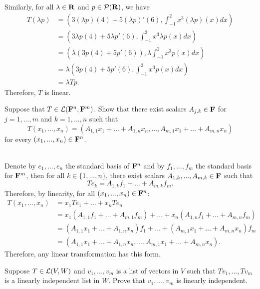 \begin{solution}
    Similarly, for all $\lambda \in \mathbf{R}$ and $p \in \mathcal{P}(\mathbf{R})$, we have
    \begin{align*}
        T(\lambda p) &= \left(3(\lambda p)(4) + 5(\lambda p)'(6), \int_{-1}^{2}x^3(\lambda p)(x)dx \right) \\
        &= \left(3\lambda p(4) + 5\lambda p'(6), \int_{-1}^{2}x^3 \lambda p(x)dx \right) \\
        &= \left(\lambda (3p(4) + 5p'(6)), \lambda\int_{-1}^{2}x^3 p(x)dx \right) \\
        &= \lambda \left(3p(4) + 5p'(6), \int_{-1}^{2}x^3 p(x)dx \right) \\
        &= \lambda Tp.
    \end{align*}
    Therefore, $T$ is linear. \\
\end{solution}

\begin{exercise}
    Suppose that $T \in \mathcal{L}(\mathbf{F}^n, \mathbf{F}^m)$. Show that there exist scalars $A_{j,k} \in \mathbf{F}$ for $j = 1, ..., m$ and $k= 1, ..., n$ such that 
    $$T(x_1, ..., x_n) = (A_{1,1}x_1 + \dots + A_{1,n}x_n, ..., A_{m,1}x_1 + \dots + A_{m,n}x_n)$$
    for every $(x_1, ..., x_n) \in \mathbf{F}^n$. \\
\end{exercise}

\begin{solution}
    \\ Denote by $e_1, ..., e_n$ the standard basis of $\mathbf{F}^n$ and by $f_1, ..., f_m$ the standard basis for $\mathbf{F}^m$, then for all $k \in \{1, ..., n\}$, there exist scalars $A_{1,k}, ..., A_{m,k} \in \mathbf{F}$ such that
    $$Te_k = A_{1,k}f_1 + \dots + A_{m,k}f_m.$$
    Therefore, by linearity, for all $(x_1, ..., x_n) \in \mathbf{F}^n$:
    \begin{align*}
        T(x_1, ..., x_n) &= x_1Te_1 + \dots + x_n Te_n \\
        &= x_1(A_{1,1}f_1 + \dots + A_{m,1}f_m) + \dots + x_n(A_{1,n}f_1 + \dots + A_{m,n}f_m) \\
        &= (A_{1,1}x_1 + \dots + A_{1,n}x_n)f_1 + \dots + (A_{m,1}x_1 + \dots + A_{m,n}x_n)f_m \\
        &= (A_{1,1}x_1 + \dots + A_{1,n}x_n, ..., A_{m,1}x_1 + \dots + A_{m,n}x_n).
    \end{align*}
    Therefore, any linear transformation has this form. \\
\end{solution}

\begin{exercise}
    Suppose $T \in \mathcal{L}(V, W)$ and $v_1, ..., v_m$ is a list of vectors in $V$ such that $Tv_1, ..., Tv_m$ is a linearly independent list in $W$. Prove that $v_1, ..., v_m$ is linearly independent. \\
\end{exercise}

